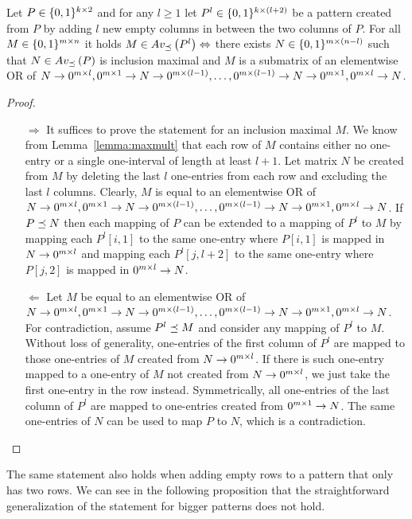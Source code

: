 \begin{thm}
\label{thm:emptymiddle}
Let $P\in\{0,1\}^{k\times2}$ and for any $l\geq1$ let $P^l\in\{0,1\}^{k\times(l+2)}$ be a pattern created from $P$ by adding $l$ new empty columns in between the two columns of $P$. For all $M\in\{0,1\}^{m\times n}$ it holds $M\in Av_{\preceq}\left(P^l\right)\Leftrightarrow$ there exists $N\in\{0,1\}^{m\times(n-l)}$ such that $N\in Av_{\preceq}\left(P\right)$ is inclusion maximal and $M$ is a submatrix of an elementwise OR of $N\rightarrow0^{m\times l},0^{m\times 1}\rightarrow N\rightarrow0^{m\times(l-1)},\dots,0^{m\times(l-1)}\rightarrow N\rightarrow0^{m\times1},0^{m\times l}\rightarrow N$.
\end{thm}
\begin{proof}
\begin{itemize}
	\item[$\Rightarrow$] It suffices to prove the statement for an inclusion maximal $M$. We know from Lemma~\ref{lemma:maxmult} that each row of $M$ contains either no one-entry or a single one-interval of length at least $l+1$. Let matrix $N$ be created from $M$ by deleting the last $l$ one-entries from each row and excluding the last $l$ columns. Clearly, $M$ is equal to an elementwise OR of $N\rightarrow0^{m\times l},0^{m\times 1}\rightarrow N\rightarrow0^{m\times(l-1)},\dots,0^{m\times(l-1)}\rightarrow N\rightarrow0^{m\times1},0^{m\times l}\rightarrow N$. If $P\preceq N$ then each mapping of $P$ can be extended to a mapping of $P^l$ to $M$ by mapping each $P^l[i,1]$ to the same one-entry where $P[i,1]$ is mapped in $N\rightarrow0^{m\times l}$ and mapping each $P^l[j,l+2]$ to the same one-entry where $P[j,2]$ is mapped in $0^{m\times l}\rightarrow N$.
	\item[$\Leftarrow$] Let $M$ be equal to an elementwise OR of $N\rightarrow0^{m\times l},0^{m\times 1}\rightarrow N\rightarrow0^{m\times(l-1)},\dots,0^{m\times(l-1)}\rightarrow N\rightarrow0^{m\times1},0^{m\times l}\rightarrow N$. For contradiction, assume $P^l\preceq M$ and consider any mapping of $P^l$ to $M$. Without loss of generality, one-entries of the first column of $P^l$ are mapped to those one-entries of $M$ created from $N\rightarrow0^{m\times l}$. If there is such one-entry mapped to a one-entry of $M$ not created from $N\rightarrow0^{m\times l}$, we just take the first one-entry in the row instead. Symmetrically, all one-entries of the last column of $P^l$ are mapped to one-entries created from $0^{m\times1}\rightarrow N$. The same one-entries of $N$ can be used to map $P$ to $N$, which is a contradiction.
\end{itemize}
\end{proof}

The same statement also holds when adding empty rows to a pattern that only has two rows. We can see in the following proposition that the straightforward generalization of the statement for bigger patterns does not hold.

